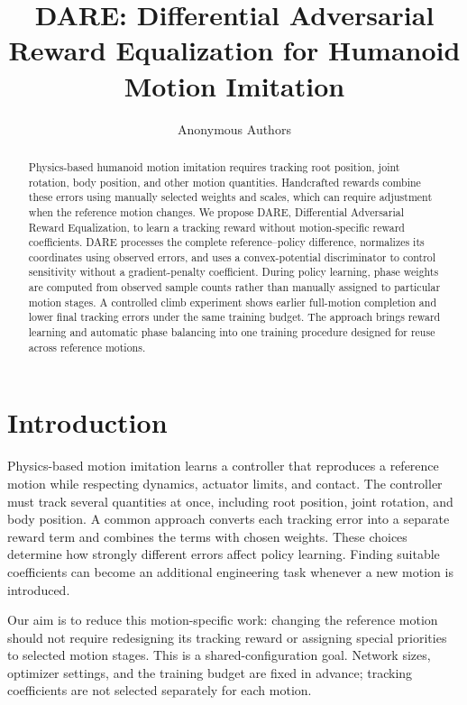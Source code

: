 \documentclass[letterpaper,10pt,conference]{ieeeconf}
\title{\LARGE\bf DARE: Differential Adversarial Reward Equalization for Humanoid Motion Imitation}
\author{Anonymous Authors}
\begin{document}
\maketitle
\thispagestyle{empty}
\pagestyle{empty}

\begin{abstract}
Physics-based humanoid motion imitation requires tracking root position,
joint rotation, body position, and other motion quantities. Handcrafted
rewards combine these errors using manually selected weights and scales,
which can require adjustment when the reference motion changes. We propose
DARE, Differential Adversarial Reward Equalization, to learn a tracking
reward without motion-specific reward coefficients. DARE processes the
complete reference--policy difference, normalizes its coordinates using
observed errors, and uses a convex-potential discriminator to control
sensitivity without a gradient-penalty coefficient. During policy learning,
phase weights are computed from observed sample counts rather than manually
assigned to particular motion stages. A controlled climb experiment shows
earlier full-motion completion and lower final tracking errors under the
same training budget. The approach brings reward learning and automatic
phase balancing into one training procedure designed for reuse across
reference motions.
\end{abstract}

\section{Introduction}
Physics-based motion imitation learns a controller that reproduces a
reference motion while respecting dynamics, actuator limits, and contact.
The controller must track several quantities at once, including root
position, joint rotation, and body position. A common approach converts
each tracking error into a separate reward term and combines the terms
with chosen weights. These choices determine how strongly different
errors affect policy learning. Finding suitable coefficients can become
an additional engineering task whenever a new motion is introduced.

Our aim is to reduce this motion-specific work: changing the reference
motion should not require redesigning its tracking reward or assigning
special priorities to selected motion stages. This is a shared-configuration
goal. Network sizes, optimizer settings, and the training budget are fixed
in advance; tracking coefficients are not selected separately for each
motion.
\end{document}
